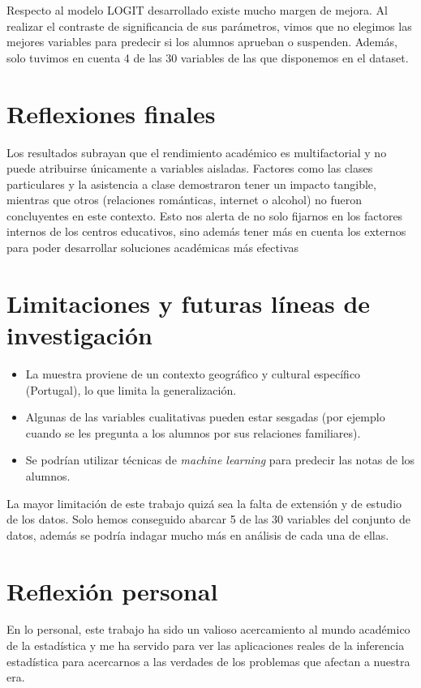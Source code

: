     Respecto al modelo LOGIT desarrollado existe mucho margen de mejora. Al realizar el contraste de significancia de sus parámetros, vimos que no elegimos las mejores variables para predecir si los alumnos aprueban o suspenden. Además, solo tuvimos en cuenta 4 de las 30 variables de las que disponemos en el dataset.   

\section{Reflexiones finales}

Los resultados subrayan que el rendimiento académico es multifactorial y no puede atribuirse únicamente a variables aisladas. Factores como las clases particulares y la asistencia a clase demostraron tener un impacto tangible, mientras que otros (relaciones románticas, internet o alcohol) no fueron concluyentes en este contexto. Esto nos alerta de no solo fijarnos en los factores internos de los centros educativos, sino además tener más en cuenta los externos para poder desarrollar soluciones académicas más efectivas

\section{Limitaciones y futuras líneas de investigación}

\begin{itemize}
    \item La muestra proviene de un contexto geográfico y cultural específico (Portugal), lo que limita la generalización.  
    \item Algunas de las variables cualitativas pueden estar sesgadas (por ejemplo cuando se les pregunta a los alumnos por sus relaciones familiares).
    \item Se podrían utilizar técnicas de \textit{machine learning} para predecir las notas de los alumnos.
\end{itemize}

La mayor limitación de este trabajo quizá sea la falta de extensión y de estudio de los datos. Solo hemos conseguido abarcar 5 de las 30 variables del conjunto de datos, además se podría indagar mucho más en análisis de cada una de ellas.

\section{Reflexión personal}

En lo personal, este trabajo ha sido un valioso acercamiento al mundo académico de la estadística y me ha servido para ver las aplicaciones reales de la inferencia estadística para acercarnos a las verdades de los problemas que afectan a nuestra era.
